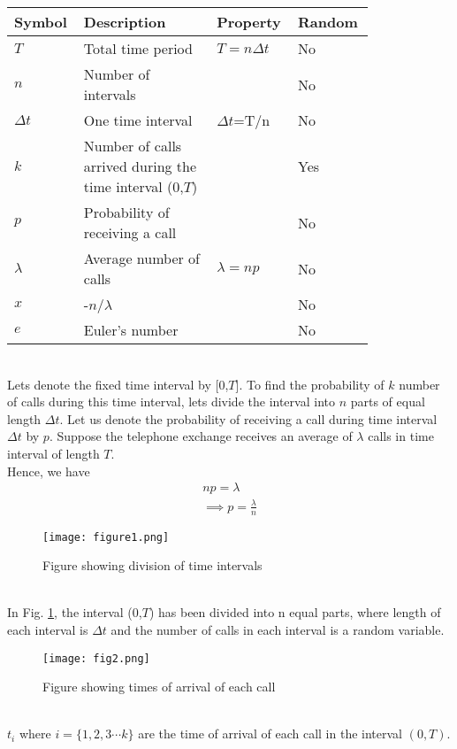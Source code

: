 \documentclass[journal,12pt,twocolumn]{IEEEtran}
\begin{document}
\begin{table}[h!]
\centering
    \begin{tabular}{|p{0.14\linewidth}|p{0.35\linewidth}|p{0.16\linewidth}|p{0.16\linewidth}|}
    \hline
    \textbf{Symbol} & \textbf{Description} & \textbf{Property} & \textbf{Random}\\[0.5ex]
    \hline
    $T$ & Total time period & $T=n\Delta t$ &No\\
    \hline
    $n$ & Number of intervals &  &No\\
    \hline
    $\Delta t$ & One time interval & $\Delta t$=T/n & No\\
    \hline
    $k$ & Number of calls arrived during the time interval (0,$T$) & & Yes\\
    \hline
    $p$ & Probability of receiving a call & &No\\
    \hline
    $\lambda$ & Average number of calls & $\lambda=np$ &No\\
    \hline
    $x$ & -$n$/$\lambda$ & &No\\
    \hline
    $e$ & Euler's number & &No\\
    \hline
    \end{tabular}
\end{table}\\
Lets denote the fixed time interval by [0,$T$].
To find the probability of $k$ number of calls during this time interval, lets divide the interval into $n$ parts of equal length $\Delta t$.
Let us denote the probability of receiving a call during time interval $\Delta t$ by $p$. Suppose the telephone exchange receives an average of $\lambda$ calls in time interval of length $T$.\\
Hence, we have
\begin{align}
    np=\lambda\\
    \implies p=\frac{\lambda}{n}
\end{align}
\begin{figure}[ht]
    \centering
    \texttt{[image: figure1.png]}
    \caption{Figure showing division of time intervals}
    \label{figure_1}
\end{figure}\\
In Fig. \ref{figure_1}, the interval (0,$T$) has been divided into n equal parts, where length of each interval is $\Delta t$ and the number of calls in each interval is a random variable.
\begin{figure}[ht]
    \centering
    \texttt{[image: fig2.png]}
    \caption{Figure showing times of arrival of each call}
    \label{Figure_2}
\end{figure}\\
$t_i$ where $i=\{1,2,3\cdots k\}$ are the time of arrival of each call in the interval $(0,T)$.\\
\end{document}
